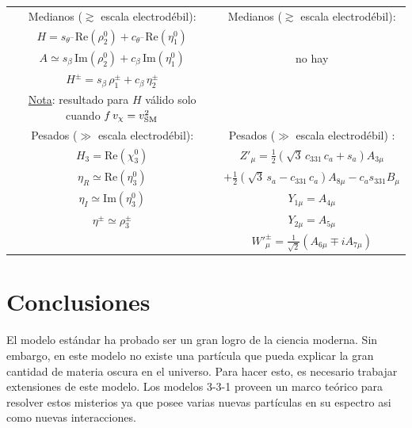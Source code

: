 \begin{center}
\begin{small}
\begin{tabular}{|c | c|}
\hline 
Medianos ($\gtrsim$ escala electrodébil): \hspace{\fill} & Medianos ($\gtrsim$ escala electrodébil): \hspace{\fill}  \\[10pt]   
$H=  s_{\theta^-} \text{Re} (\rho_2^0)+ c_{\theta^-} \text{Re} (\eta_1^0) $ &       \\[10pt]  
$A \simeq s_\beta \, \text{Im} (\rho_2^0) + c_\beta \, \text{Im} (\eta_1^0) $ \hspace{0.05in}  & no hay    \\[10pt]  
${H^{\pm}} = s_\beta \, \rho_1^{\pm} + c_\beta \, \eta_2^{\pm}  $ \hspace{0.6in}  &  \\[15pt]
\underline{Nota}: resultado para $H$ válido solo cuando $f\, v_\chi = v_{\rm SM}^2$ &\\[10pt] 
 \hline  
Pesados ($\gg$ escala electrodébil): \hspace{\fill} & Pesados ($\gg$ escala electrodébil) : \hspace{\fill} \\[10pt] 
 $H_3 = \text{Re}(\chi_3^0) $ & \hspace{-0.6in} $Z'_\mu = \frac{1}{2} (\sqrt{3} \,c_{331}\, c_a+s_a ) A_{3\mu} $   \\[5pt] 
$\eta_R \simeq \text{Re} (\eta_3^0)$ & \hspace{0.475in}$+\frac{1}{2} (\sqrt{3} \,s_a - c_{331}\, c_a ) A_{8\mu} -c_a s_{331} B_\mu $ \\[10pt] 
  $\eta_I \simeq \text{Im} (\eta_3^0) $  & \hspace{-1.7in}  $Y_{1\mu} = A_{4\mu} $   \\[10pt]   
 $\eta^{\pm} \simeq \rho_3^{\pm} $ & \hspace{-1.7in} $ Y_{2\mu} = A_{5\mu} $   \\[10pt]   
   & \hspace{-0.8in} $W'^{\pm}_\mu = \frac{1}{\sqrt{2}} \left( A_{6\mu}\mp i A_{7\mu} \right)$   \\%
 \hline
\end{tabular}
\end{small}
\label{EigenVals331}
\end{center}

\newpage
\section[\hspace{-0.14in}Conclusiones]{Conclusiones}


El modelo estándar ha probado ser un gran logro de la ciencia moderna. Sin embargo, en este modelo no existe una partícula que pueda explicar la gran cantidad de materia oscura en el universo. Para hacer esto, es necesario trabajar extensiones de este modelo. Los modelos 3-3-1 proveen un marco teórico para resolver estos misterios ya que posee varias nuevas partículas en su espectro asi como nuevas interacciones.
